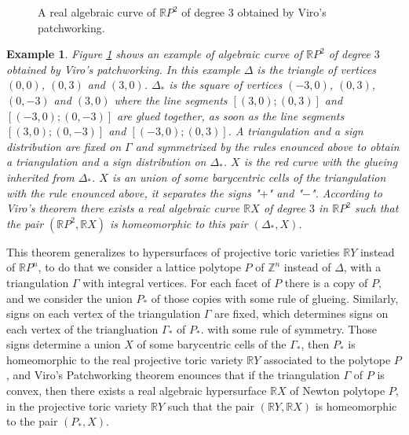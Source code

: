 \documentclass{article}
\newtheorem{example}{Example}
\begin{document}
\begin{figure}[h]
\caption{A real algebraic curve of $\mathbb{R}P^2$ of degree $3$ obtained by Viro's patchworking.}
\label{Patchwork}
\end{figure}

\begin{example}
    Figure \ref{Patchwork} shows an example of algebraic curve of $\mathbb{R}P^2$ of degree $3$ obtained by Viro's patchworking. In this example $\Delta$ is the triangle of vertices $(0,0)$, $(0,3)$ and $(3,0)$. $\Delta_*$ is the square of vertices $(-3,0)$, $(0,3)$, $(0,-3)$ and $(3,0)$ where the line segments $[(3,0);(0,3)]$ and  $[(-3,0);(0,-3)]$ are glued together, as soon as the line segments $[(3,0);(0,-3)]$ and  $[(-3,0);(0,3)]$. A triangulation and a sign distribution are fixed on $\Gamma$ and symmetrized by the rules enounced above to obtain a triangulation and a sign distribution on $\Delta_*$. $X$ is the red curve with the glueing inherited from $\Delta_*$. $X$ is an union of some barycentric cells of the triangulation with the rule enounced above, it separates the signs "$+$" and "$-$". According to Viro's theorem there exists a real algebraic curve $\mathbb{R}X$ of degree $3$ in $\mathbb{R}P^2$ such that the pair $(\mathbb{R}P^2,\mathbb{R}X)$ is homeomorphic to this pair $(\Delta_*,X)$.
\end{example}

This theorem generalizes to hypersurfaces of projective toric varieties $\mathbb{R}Y$ instead of $\mathbb{R}P^n$, to do that we consider a lattice polytope $P$ of $\mathbb{Z}^n$ instead of $\Delta$, with a triangulation $\Gamma$ with integral vertices. For each facet of $P$ there is a copy of $P$, and we consider the union $P_*$ of those copies with some rule of glueing. Similarly, signs on each vertex of the triangulation $\Gamma$ are fixed, which determines signs on each vertex of the triangluation $\Gamma_*$ of $P_*$. with some rule of symmetry. Those signs determine a union $X$ of some barycentric cells of the $\Gamma_*$, then $P_*$ is homeomorphic to the real projective toric variety $\mathbb{R}Y$ associated to the polytope $P$, and Viro's Patchworking theorem enounces that if the triangulation $\Gamma$ of $P$ is convex, then there exists a real algebraic hypersurface $\mathbb{R}X$ of Newton polytope $P$, in the projective toric variety $\mathbb{R}Y$ such that the pair $(\mathbb{R}Y,\mathbb{R}X)$ is homeomorphic to the pair $(P_*,X)$.
\end{document}
